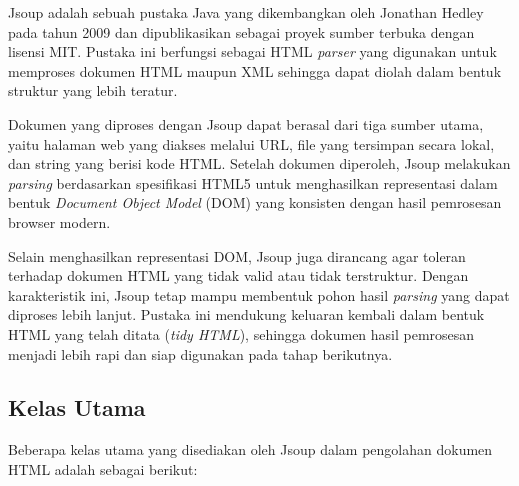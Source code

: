 

Jsoup adalah sebuah pustaka Java yang dikembangkan oleh Jonathan Hedley pada tahun 2009 dan dipublikasikan sebagai proyek sumber terbuka dengan lisensi MIT. Pustaka ini berfungsi sebagai HTML \textit{parser} yang digunakan untuk memproses dokumen HTML maupun XML sehingga dapat diolah dalam bentuk struktur yang lebih teratur.  

Dokumen yang diproses dengan Jsoup dapat berasal dari tiga sumber utama, yaitu halaman web yang diakses melalui URL, file yang tersimpan secara lokal, dan string yang berisi kode HTML. Setelah dokumen diperoleh, Jsoup melakukan \textit{parsing} berdasarkan spesifikasi HTML5 untuk menghasilkan representasi dalam bentuk \textit{Document Object Model} (DOM) yang konsisten dengan hasil pemrosesan browser modern.  

Selain menghasilkan representasi DOM, Jsoup juga dirancang agar toleran terhadap dokumen HTML yang tidak valid atau tidak terstruktur. Dengan karakteristik ini, Jsoup tetap mampu membentuk pohon hasil \textit{parsing} yang dapat diproses lebih lanjut. Pustaka ini mendukung keluaran kembali dalam bentuk HTML yang telah ditata (\textit{tidy HTML}), sehingga dokumen hasil pemrosesan menjadi lebih rapi dan siap digunakan pada tahap berikutnya.

\subsection{Kelas Utama}
\label{subsec:0227-kelas-utama}


Beberapa kelas utama yang disediakan oleh Jsoup dalam pengolahan dokumen HTML adalah sebagai berikut:

